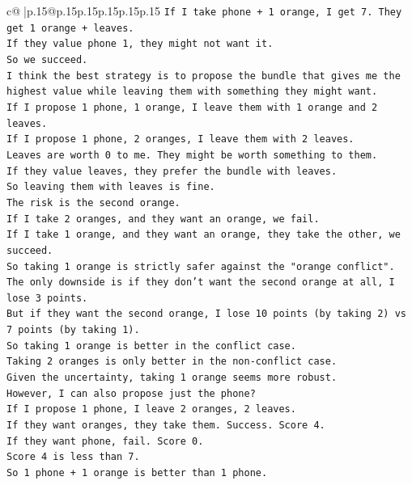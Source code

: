 \documentclass{article}
\begin{document}
{\begin{supertabular}{c@{$\;$}|p{.15\linewidth}@{}p{.15\linewidth}p{.15\linewidth}p{.15\linewidth}p{.15\linewidth}p{.15\linewidth}}
{{{\texttt{If I take phone + 1 orange, I get 7. They get 1 orange + leaves.} \\
\texttt{If they value phone 1, they might not want it.} \\
\texttt{So we succeed.} \\
\texttt{I think the best strategy is to propose the bundle that gives me the highest value while leaving them with something they might want.} \\
\texttt{If I propose 1 phone, 1 orange, I leave them with 1 orange and 2 leaves.} \\
\texttt{If I propose 1 phone, 2 oranges, I leave them with 2 leaves.} \\
\texttt{Leaves are worth 0 to me. They might be worth something to them.} \\
\texttt{If they value leaves, they prefer the bundle with leaves.} \\
\texttt{So leaving them with leaves is fine.} \\
\texttt{The risk is the second orange.} \\
\texttt{If I take 2 oranges, and they want an orange, we fail.} \\
\texttt{If I take 1 orange, and they want an orange, they take the other, we succeed.} \\
\texttt{So taking 1 orange is strictly safer against the "orange conflict".} \\
\texttt{The only downside is if they don't want the second orange at all, I lose 3 points.} \\
\texttt{But if they want the second orange, I lose 10 points (by taking 2) vs 7 points (by taking 1).} \\
\texttt{So taking 1 orange is better in the conflict case.} \\
\texttt{Taking 2 oranges is only better in the non{-}conflict case.} \\
\texttt{Given the uncertainty, taking 1 orange seems more robust.} \\
\texttt{However, I can also propose just the phone?} \\
\texttt{If I propose 1 phone, I leave 2 oranges, 2 leaves.} \\
\texttt{If they want oranges, they take them. Success. Score 4.} \\
\texttt{If they want phone, fail. Score 0.} \\
\texttt{Score 4 is less than 7.} \\
\texttt{So 1 phone + 1 orange is better than 1 phone.} \\
}}}
\end{supertabular}}
\end{document}
